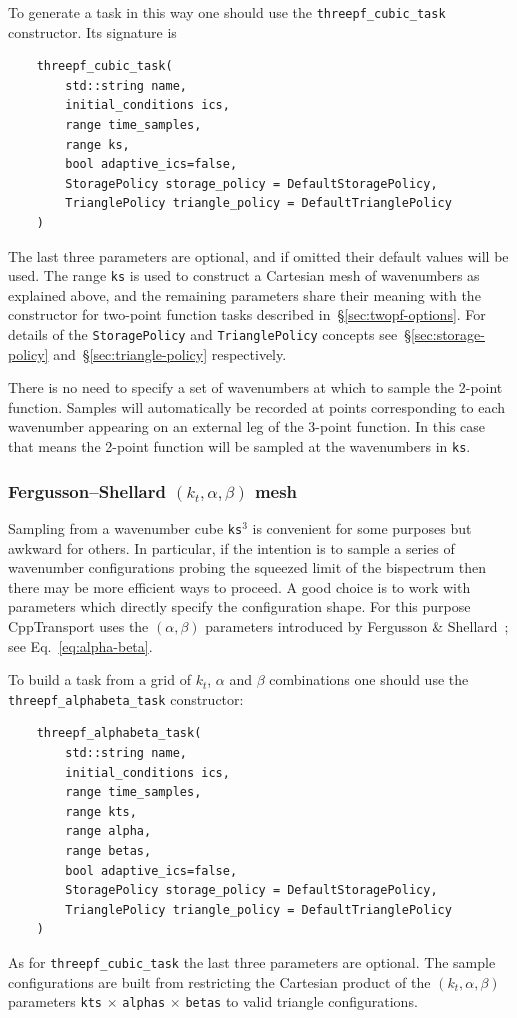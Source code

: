 \documentclass[11pt,a4paper]{article}
\newcommand{\packagefont}{\sffamily}
\newcommand{\CppTransport}{{\packagefont CppTransport}}
\begin{document}
To generate a task in this way one should use the
\texttt{threepf_cubic_task} constructor. Its signature is
\begin{verbatim}
    threepf_cubic_task(
        std::string name,
        initial_conditions ics,
        range time_samples,
        range ks,
        bool adaptive_ics=false,
        StoragePolicy storage_policy = DefaultStoragePolicy,
        TrianglePolicy triangle_policy = DefaultTrianglePolicy
    )
\end{verbatim}
The last three parameters are optional, and if omitted their
default values will be used.
The range \texttt{ks} is used to construct a Cartesian mesh
of wavenumbers as explained above, and the remaining parameters
share their meaning with the constructor for two-point function tasks
described in~\S\ref{sec:twopf-options}.
For details of the
\texttt{StoragePolicy} and
\texttt{TrianglePolicy} concepts
see~\S\ref{sec:storage-policy} and~\S\ref{sec:triangle-policy} respectively.

There is no need to specify a set of wavenumbers at which to sample the 2-point function.
Samples will automatically be recorded at points corresponding to each wavenumber appearing
on an external leg of the 3-point function.
In this case that means the 2-point function will be sampled at the wavenumbers
in \texttt{ks}.

\subsubsection{Fergusson--Shellard $(k_t, \alpha, \beta)$ mesh}
Sampling from a wavenumber cube \texttt{ks}$^3$
is convenient for some purposes but awkward for others.
In particular, if the intention is to sample a series of wavenumber configurations
probing the squeezed limit of the bispectrum then there may be more efficient
ways to proceed.
A good choice is to work with parameters which directly specify the configuration
shape.
For this purpose {\CppTransport} uses the $(\alpha, \beta)$ parameters
introduced by Fergusson \& Shellard~\cite{Fergusson:2006pr}; see Eq.~\eqref{eq:alpha-beta}.

To build a task from a grid of $k_t$, $\alpha$ and $\beta$ combinations one should use
the \texttt{threepf_alphabeta_task} constructor:
\begin{verbatim}
    threepf_alphabeta_task(
        std::string name,
        initial_conditions ics,
        range time_samples,
        range kts,
        range alpha,
        range betas,
        bool adaptive_ics=false,
        StoragePolicy storage_policy = DefaultStoragePolicy,
        TrianglePolicy triangle_policy = DefaultTrianglePolicy
    )    
\end{verbatim}
As for \texttt{threepf_cubic_task} the last three parameters are optional.
The sample configurations are built from restricting the Cartesian product
of the $(k_t, \alpha, \beta)$ parameters
\texttt{kts} $\times$ \texttt{alphas} $\times$ \texttt{betas}
to valid triangle configurations.
\end{document}
